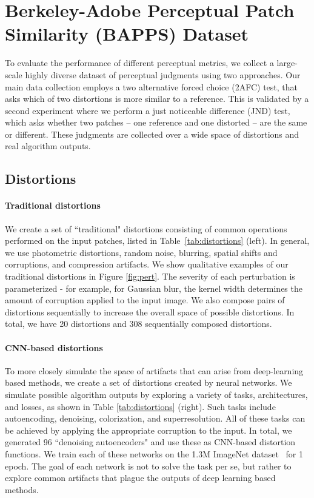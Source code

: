 \section{Berkeley-Adobe Perceptual Patch Similarity (BAPPS) Dataset}
\label{sec:methods}

To evaluate the performance of different perceptual metrics, we collect a large-scale highly diverse dataset of perceptual judgments using two approaches.
Our main data collection employs a two alternative forced choice (2AFC) test, that asks which of two distortions is more similar to a reference.
This is validated by a second experiment where we perform a just noticeable difference (JND) test, which asks whether two patches -- one reference and one distorted -- are the same or different. These judgments are collected over a wide space of distortions and real algorithm outputs.



\subsection{Distortions}

\paragraph{Traditional distortions} We create a set of ``traditional" distortions consisting of common operations performed on the input patches, listed in Table~\ref{tab:distortions} (left). In general, we use photometric distortions, random noise, blurring, spatial shifts and corruptions, and compression artifacts. We show qualitative examples of our traditional distortions in Figure \ref{fig:pert}. The severity of each perturbation is parameterized - for example, for Gaussian blur, the kernel width determines the amount of corruption applied to the input image. We also compose pairs of distortions sequentially to increase the overall space of possible distortions. In total, we have 20 distortions and 308 sequentially composed distortions.

\paragraph{CNN-based distortions} To more closely simulate the space of artifacts that can arise from deep-learning based methods, we create a set of distortions created by neural networks. We simulate possible algorithm outputs by exploring a variety of tasks, architectures, and losses, as shown in Table \ref{tab:distortions} (right). Such tasks include autoencoding, denoising, colorization, and superresolution. All of these tasks can be achieved by applying the appropriate corruption to the input. In total, we generated 96 ``denoising autoencoders" and use these as CNN-based distortion functions. We train each of these  networks on the 1.3M ImageNet dataset~\cite{russakovsky2015imagenet} for 1 epoch. The goal of each network is not to solve the task per se, but rather to explore common artifacts that plague the outputs of deep learning based methods.

